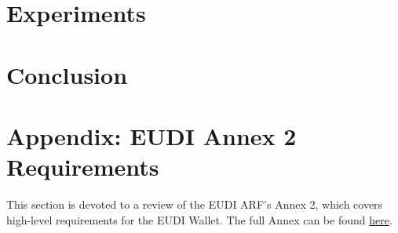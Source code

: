 \documentclass{iacrtrans}
\newcommand{\jbel}[1]{{\color{blue}{}jbel: #1}}
\begin{document}
\section{Experiments}
\label{sec:experiments}




\section{Conclusion}
\label{sec:conclusion}




\section{Appendix: EUDI Annex 2 Requirements}
\label{sec:annex}

This section is devoted to a review of the EUDI ARF's Annex 2, which covers high-level requirements for the EUDI Wallet. 
The full Annex can be found \href{https://eu-digital-identity-wallet.github.io/eudi-doc-architecture-and-reference-framework/1.4.0/annexes/annex-2/annex-2-high-level-requirements/#a231-topic-1-accessing-public-and-private-online-services-with-eudi-wallet}{here}.


\end{document}
